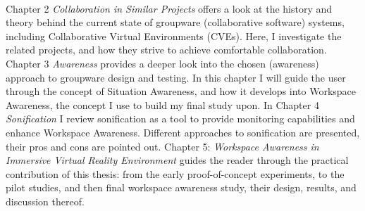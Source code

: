 \paragraph{}
Chapter 2 \textit{Collaboration in Similar Projects} offers a look at the history and theory behind the current state of groupware (collaborative software) systems, including Collaborative Virtual Environments (CVEs). Here, I investigate the related projects, and how they strive to achieve comfortable collaboration. Chapter 3 \textit{Awareness} provides a deeper look into the chosen (awareness) approach to groupware design and testing. In this chapter I will guide the user through the concept of Situation Awareness, and how it develops into Workspace Awareness, the concept I use to build my final study upon. In Chapter 4 \textit{Sonification} I review sonification as a tool to provide monitoring capabilities and enhance Workspace Awareness. Different approaches to sonification are presented, their pros and cons are pointed out. Chapter 5: \textit{Workspace Awareness in Immersive Virtual Reality Environment} guides the reader through the practical contribution of this thesis: from the early proof-of-concept experiments, to the pilot studies, and then final workspace awareness study, their design, results, and discussion thereof.

